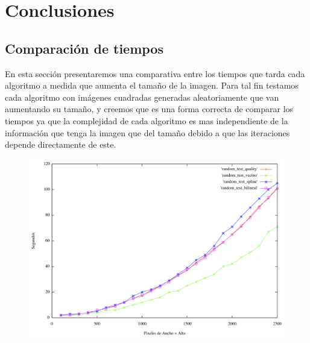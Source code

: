 \section{Conclusiones}

\subsection{Comparación de tiempos}

En esta sección presentaremos una comparativa entre los tiempos que tarda cada algoritmo a medida que aumenta el tamaño de la imagen. Para tal fin testamos cada algoritmo con imágenes cuadradas generadas aleatoriamente que van aumentando su tamaño, y creemos que es una forma correcta de comparar los tiempos ya que la complejidad de cada algoritmo es mas independiente de la información que tenga la imagen que del tamaño debido a que las iteraciones depende directamente de este.

\begin{figure}[h]
       \includegraphics[width=1\textwidth]{imagenes/tiempo_algoritmos_random.png}
\end{figure}

